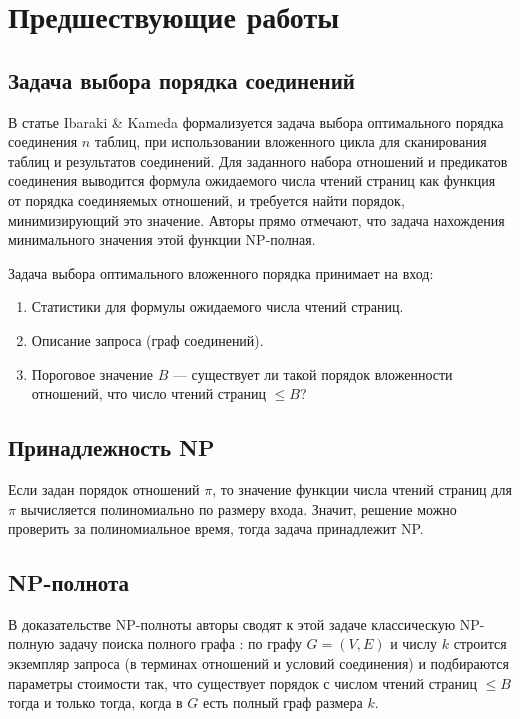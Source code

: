\section{Предшествующие работы}
\subsection{Задача выбора порядка соединений}


В статье  Ibaraki \& Kameda \cite{IK} формализуется задача выбора оптимального порядка соединения $n$ таблиц,
при использовании вложенного цикла для сканирования таблиц и результатов соединений.
Для заданного набора отношений и предикатов соединения выводится формула ожидаемого числа чтений страниц как функция от порядка соединяемых отношений,
и требуется найти порядок, минимизирующий это значение. Авторы прямо отмечают, что задача нахождения минимального значения этой функции NP-полная.

Задача выбора оптимального вложенного порядка принимает на вход:
\begin{enumerate}
  \item Статистики для формулы ожидаемого числа чтений страниц.
  \item Описание запроса (граф соединений).
  \item Пороговое значение $B$ --- существует ли такой порядок вложенности отношений, что число чтений страниц $\le B$?
\end{enumerate}


\subsection{Принадлежность NP}


Если задан порядок отношений $\pi$, то значение функции числа чтений страниц для $\pi$ вычисляется полиномиально по размеру входа. Значит, решение можно проверить за полиномиальное время, тогда задача принадлежит NP.


\subsection{NP-полнота}


В доказательстве NP-полноты авторы сводят к этой задаче классическую NP-полную задачу поиска полного графа \cite{RichKarp}:
по графу $G=(V,E)$ и числу $k$ строится экземпляр запроса (в терминах отношений и условий соединения) и подбираются параметры стоимости так, что
существует порядок с числом чтений страниц $\leq B$ тогда и только тогда, когда в $G$ есть полный граф размера $k$.


